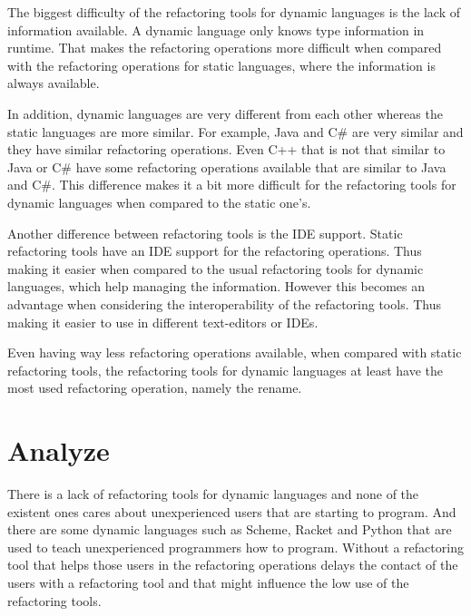 The biggest difficulty of the refactoring tools for dynamic languages is the lack of information available. 
A dynamic language only knows type information in runtime. 
That makes the refactoring operations more difficult when compared with the refactoring operations for static languages, where the information is always available.

In addition, dynamic languages are very different from each other whereas the static languages are more similar.
For example, Java and C\# are very similar and they have similar refactoring operations.
Even C++ that is not that similar to Java or C\# have some refactoring operations available that are similar to Java and C\#. 
This difference makes it a bit more difficult for the refactoring tools for dynamic languages when compared to the static one's. %

Another difference between refactoring tools is the IDE support. 
Static refactoring tools have an IDE support for the refactoring operations. 
Thus making it easier when compared to the usual refactoring tools for dynamic languages, which help managing the information. 
However this becomes an advantage when considering the interoperability of the refactoring tools. 
Thus making it easier to use in different text-editors or IDEs.

Even having way less refactoring operations available, when compared with static refactoring tools, the refactoring tools for dynamic languages at least have the most used refactoring operation, namely the rename.


\section{Analyze}

There is a lack of refactoring tools for dynamic languages and none of the existent ones cares about unexperienced users that are starting to program. 
And there are some dynamic languages such as Scheme, Racket and Python that are used to teach unexperienced programmers how to program.
Without a refactoring tool that helps those users in the refactoring operations delays the contact of the users with a refactoring tool and that might influence the low use of the refactoring tools.

